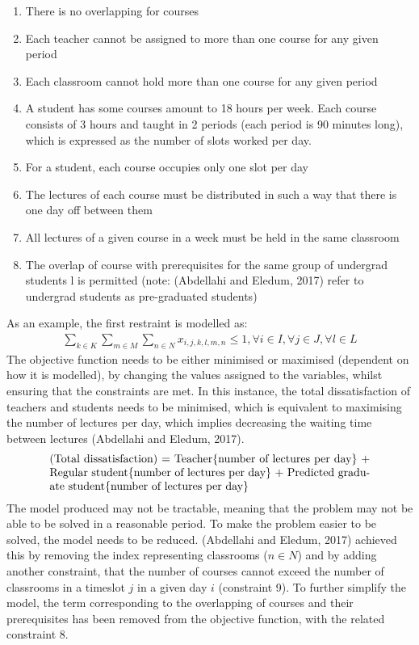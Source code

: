 \documentclass[a4paper, 12pt]{report}
\begin{document}
\begin{enumerate}
	\item There is no overlapping for courses
	\item Each teacher cannot be assigned to more than one course for any given
	period
	\item Each classroom cannot hold more than one course for any given period
	\item A student has some courses amount to 18 hours per week. Each course
	consists of 3 hours and taught in 2 periods (each period is 90 minutes
	long), which is expressed as the number of slots worked per day.
	\item For a student, each course occupies only one slot per day
	\item The lectures of each course must be distributed in such a way that
	there is one day off between them
	\item All lectures of a given course in a week must be held in the same
	classroom
	\item The overlap of course with prerequisites for the same group of
	undergrad students l is permitted (note: (Abdellahi and Eledum, 2017) refer
	to undergrad students as pre-graduated students)
\end{enumerate}

As an example, the first restraint is modelled as:
\begin{align*}
	\sum_{k \in K} \sum_{m \in M} \sum_{n \in N} x_{i,j,k,l,m,n} \leq 1,
	\forall i \in I, \forall j \in J, \forall l \in L
\end{align*}
The objective function needs to be either minimised or maximised (dependent on
how it is modelled), by changing the values assigned to the variables, whilst
ensuring that the constraints are met. In this instance, the total
dissatisfaction of teachers and students needs to be minimised, which is
equivalent to maximising the number of lectures per day, which implies
decreasing the waiting time between lectures (Abdellahi and Eledum, 2017).
\begin{align*}
	\parbox[t]{10cm}{(Total dissatisfaction) = Teacher\{number of lectures per
	day\} + Regular student\{number of lectures per day\} + Predicted graduate
	student\{number of lectures per day\}}
\end{align*}
The model produced may not be tractable, meaning that the problem may not be
able to be solved in a reasonable period. To make the problem easier to be
solved, the model needs to be reduced. (Abdellahi and Eledum, 2017) achieved
this by removing the index representing classrooms ($n\in N$) and by adding
another constraint, that the number of courses cannot exceed the number of
classrooms in a timeslot $j$ in a given day $i$ (constraint 9). To further
simplify the model, the term corresponding to the overlapping of courses
and their prerequisites has been removed from the objective function, with the
related constraint 8.
\end{document}
